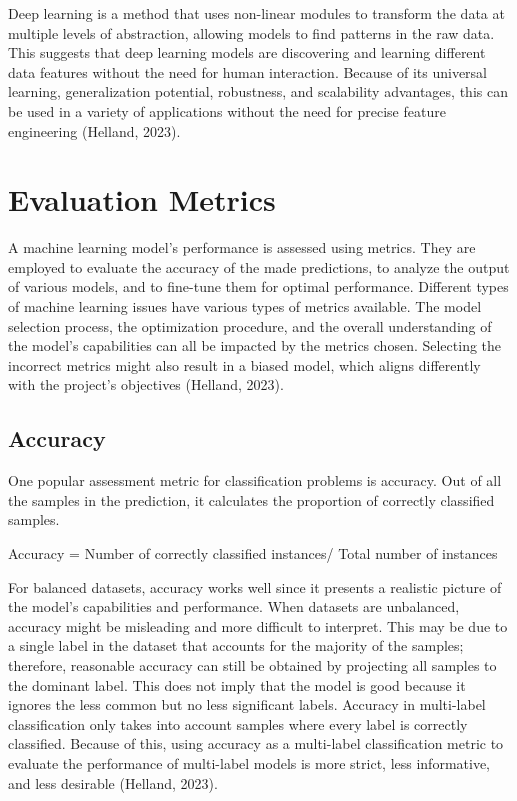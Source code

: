 Deep learning is a method that uses non-linear modules to transform the data at multiple levels of abstraction, allowing models to find patterns in the raw data. This suggests that deep learning models are discovering and learning different data features without the need for human interaction. Because of its universal learning, generalization potential, robustness, and scalability advantages, this can be used in a variety of applications without the need for precise feature engineering (Helland, 2023).

\section{Evaluation Metrics}

A machine learning model's performance is assessed using metrics. They are employed to evaluate the accuracy of the made predictions, to analyze the output of various models, and to fine-tune them for optimal performance. Different types of machine learning issues have various types of metrics available. The model selection process, the optimization procedure, and the overall understanding of the model's capabilities can all be impacted by the metrics chosen. Selecting the incorrect metrics might also result in a biased model, which aligns differently with the project’s objectives (Helland, 2023).

\subsection{Accuracy}

One popular assessment metric for classification problems is accuracy. Out of all the samples in the prediction, it calculates the proportion of correctly classified samples. 

Accuracy = Number of correctly classified instances/ Total number of instances

For balanced datasets, accuracy works well since it presents a realistic picture of the model's capabilities and performance. When datasets are unbalanced, accuracy might be misleading and more difficult to interpret. This may be due to a single label in the dataset that accounts for the majority of the samples; therefore, reasonable accuracy can still be obtained by projecting all samples to the dominant label. This does not imply that the model is good because it ignores the less common but no less significant labels. Accuracy in multi-label classification only takes into account samples where every label is correctly classified. Because of this, using accuracy as a multi-label classification metric to evaluate the performance of multi-label models is more strict, less informative, and less desirable (Helland, 2023).
